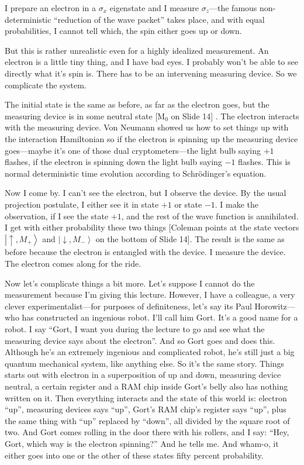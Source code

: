 \documentclass[twocolumn,prb]{revtex4}
\newcommand{\ket}[1]{\left|#1\right\rangle}
\newcommand{\up}{\uparrow}
\newcommand{\dw}{\downarrow}
\begin{document}
I prepare an electron in a $\sigma_x$ eigenstate and I measure $\sigma_z$---the famous non-deterministic ``reduction of the wave packet'' takes place, and with equal probabilities, I cannot tell which, the spin either goes up or down.

But this is rather unrealistic even for a highly idealized measurement. An electron is a little tiny thing, and I have bad eyes. I probably won't be able to see directly what it's spin is. There has to be an intervening measuring device. So we complicate the system.

The initial state is the same as before, as far as the electron goes, but the measuring device is in some neutral state [M$_0$ on Slide 14]%
. The electron interacts with the measuring device. Von Neumann showed us how to set things up with the interaction Hamiltonian so if the electron is spinning up the measuring device goes---maybe it's one of those dual cryptometers---the light bulb saying $+1$ flashes, if the electron is spinning down the light bulb saying $-1$ flashes. This is normal deterministic time evolution according to Schrödinger's equation.

Now I come by. I can't see the electron, but I observe the device. By the usual projection postulate, I either see it in state $+1$ or state $-1$. I make the observation, if I see the state $+1$, and the rest of the wave function is annihilated. I get with either probability these two things [Coleman points at the state vectors $\ket{\up,M_+}$ and $\ket{\dw,M_-}$ on the bottom of Slide 14].  The result is the same as before because the electron is entangled with the device. I measure the device. The electron comes along for the ride.

Now let's complicate things a bit more. Let's suppose I cannot do the measurement because I'm giving this lecture. However, I have a colleague, a very clever experimentalist---for purposes of definiteness, let's say its Paul Horowitz---who has constructed an ingenious robot. I'll call him Gort. It's a good name for a robot. I say ``Gort, I want you during the lecture to go and see what the measuring device says about the electron''. And so Gort goes and does this. Although he's an extremely ingenious and complicated robot, he's still just a big quantum mechanical system, like anything else. So it's the same story. Things starts out with electron in a superposition of up and down, %
measuring device neutral, a certain register and a RAM chip inside Gort's belly also has nothing written on it. Then everything interacts and the state of this world is: electron ``up'', measuring devices says ``up'', Gort's RAM chip's register says ``up'', plus the same thing with ``up'' replaced by ``down'', all divided by the square root of two. And Gort comes rolling in the door there with his rollers, and I say: ``Hey, Gort, which way is the electron spinning?'' And he tells me. And wham-o, it either goes into one or the other of these states fifty percent probability.
\end{document}
